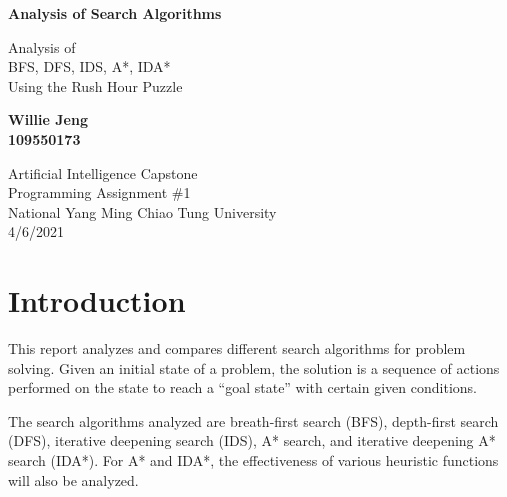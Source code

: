 \documentclass[12pt, a4paper]{article}
\begin{document}
\begin{titlepage}
   \begin{center}

       \vspace*{3cm}

       \Huge
       \textbf{Analysis of Search Algorithms}
        
       \vspace{0.5cm}
    
       \LARGE
       Analysis of \\
       BFS, DFS, IDS, A*, IDA* \\
       Using the Rush Hour Puzzle


       \vspace{3cm}

       \Large
       \textbf{Willie Jeng} \\
       \textbf{109550173}

       \vspace{0.8cm}

       \Large
       Artificial Intelligence Capstone \\
       Programming Assignment \#1\\
       National Yang Ming Chiao Tung University \\
       4/6/2021

   \end{center} 
\end{titlepage}


\tableofcontents

\section{Introduction}

This report analyzes and compares different search algorithms for problem solving. Given an initial state of a problem, the solution is a sequence of actions performed on the state to reach a ``goal state'' with certain given conditions.

The search algorithms analyzed are breath-first search (BFS), depth-first search (DFS), iterative deepening search (IDS), A* search, and iterative deepening A* search (IDA*). For A* and IDA*, the effectiveness of various heuristic functions will also be analyzed. 
\end{document}
